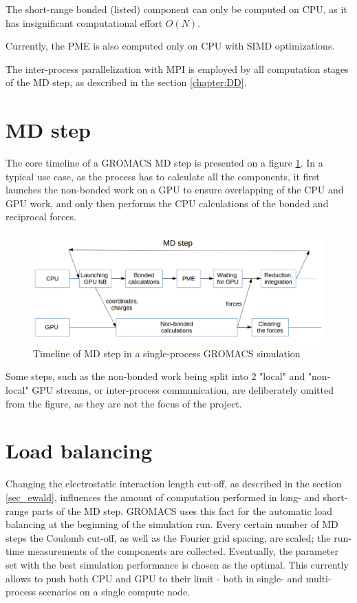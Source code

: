 \documentclass[12pt,a4paper]{report}
\newcommand{\draft}[1]{#1}
\begin{document}
The short-range bonded (listed) component can only be computed on CPU, as it has insignificant computational effort $O(N)$.

Currently, the PME is also computed only on CPU with SIMD optimizations. 

The inter-process parallelization with MPI is employed by all computation stages of the MD step, as described in the section \ref{chapter:DD}.

\section{MD step}
\FloatBarrier
The core timeline of a GROMACS MD step is presented on a figure \ref{fig:step-orig}. In a typical use case, as the process has to calculate all the components, it first launches the non-bonded work on a GPU to ensure overlapping of the CPU and GPU work, and only then performs the CPU calculations of the bonded and reciprocal forces. 
\begin{figure}
    \centering
    \includegraphics[width=1\textwidth]{pics/mdstep-orig.png}
    \caption{Timeline of MD step in a single-process GROMACS simulation}
    \label{fig:step-orig}
\end{figure}
\FloatBarrier

Some steps, such as  the non-bonded work being split into 2 "local" and "non-local" GPU streams, or inter-process communication, are deliberately omitted from the figure, as they are not the focus of the project. 


\section{Load balancing} \label{PMEtuning}
Changing the electrostatic interaction length cut-off, as described in the section \ref{sec_ewald}, influences the amount of computation performed in long- and short-range parts of the MD step. GROMACS uses this fact for the automatic load balancing at the beginning of the simulation run. Every certain number of MD steps the Coulomb cut-off, as well as the Fourier grid spacing, are scaled; the run-time measurements of the components are collected. Eventually, the parameter set with the best simulation performance is chosen as the optimal. This currently allows to push both CPU and GPU to their limit - both in single- and multi-process scenarios on a single compute node.
\end{document}

